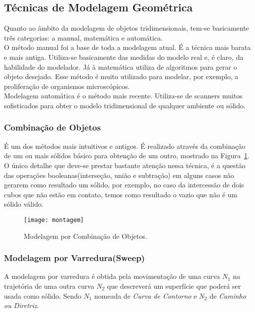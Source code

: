 \subsection{Técnicas de Modelagem Geométrica}
Quanto ao âmbito da modelagem de objetos tridimensionais, tem-se basicamente três categorias: a manual, matemática e automática. \\

O método manual foi a base de toda a modelagem atual. É a técnica mais barata e mais antiga.  Utiliza-se basicamente das medidas do modelo real e, é claro, da habilidade do modelador. Já à matemática utiliza de algoritmos para gerar o objeto desejado. Esse método é muito utilizado para modelar, por exemplo, a proliferação de organismos microscópicos.\\

Modelagem automática é o método mais recente. Utiliza-se de scanners muitos sofisticados para obter o modelo tridimensional de qualquer ambiente ou sólido.

\subsubsection{Combinação de Objetos}
É um dos métodos mais intuitivos e antigos. É realizado através da combinação de um ou mais sólidos básico para obtenção de um outro\cite{hearn}, mostrado na Figura~\ref{fg:comb}. O  único detalhe que deve-se prestar bastante atenção nessa técnica, é a questão das operações booleanas(interseção, união e subtração) em alguns casos não gerarem como resultado um sólido, por exemplo, no caso da intercessão de dois cubos que não estão em contato, temos como resultado o vazio que não é um sólido válido.

\begin{figure}[ht!]
	\centering
	\texttt{[image: montagem]}
	\caption{Modelagem por Combinação de Objetos.}
	\label{fg:comb}
\end{figure} 

\subsubsection{Modelagem por Varredura(Sweep)}
A modelagem por varredura é obtida pela movimentação de uma curva $N_1$ na trajetória de uma outra curva $N_2$ que descreverá um superfície que poderá ser usada como sólido. Sendo $N_1$ nomeada de \textit{Curva de Contorno} e $N_2$ de \textit{Caminho ou Diretriz}\cite{3dsmod}.\\

